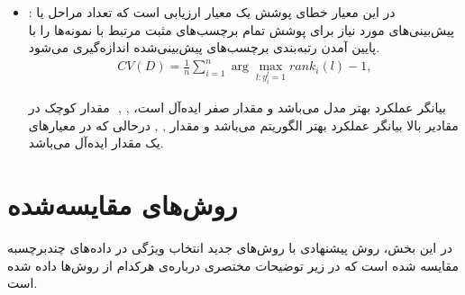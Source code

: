 \begin{itemize}
	\item	{}:
	در این معیار خطای پوشش یک معیار ارزیابی است که تعداد مراحل یا پیش‌بینی‌های مورد نیاز برای پوشش تمام برچسب‌های مثبت مرتبط با نمونه‌ها را با پایین آمدن رتبه‌بندی برچسب‌های پیش‌بینی‌شده اندازه‌گیری می‌شود.
	\begin{align}
		{CV(D)} = \frac{1}{n} \sum_{i=1}^{n} \arg \max_{l:y^l_i=1}rank_i(l)-1,
	\end{align}
	
	مقدار کوچک در ‎ ,‎ ,‎‎‎‎ بیانگر عملکرد بهتر مدل می‌باشد و مقدار صفر ایده‌آل است، درحالی که در معیارهای
	 ,‎ ‎,  ‎‎مقادیر بالا بیانگر عملکرد بهتر الگوریتم می‌باشد و مقدار یک مقدار ایده‌آل می‌باشد.
\end{itemize}
\section{روش‌های مقایسه‌شده}

در این بخش، روش پیشنهادی با روش‌های جدید انتخاب ویژگی در داده‌های چندبرچسبه مقایسه شده‌ است که در زیر توضیحات مختصری درباره‌ی هرکدام از روش‌ها داده شده است.


